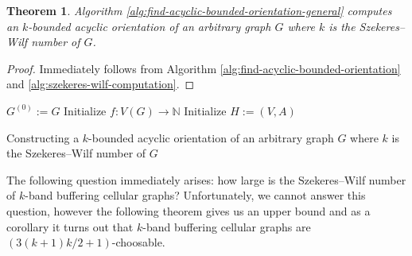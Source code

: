 \documentclass[a4paper, 12pt]{article}
\newtheorem{theo}[lem]{Theorem}
\begin{document}
\begin{theo} Algorithm \ref{alg:find-acyclic-bounded-orientation-general} computes an $k$-bounded acyclic orientation of an arbitrary graph $G$ where $k$ is the Szekeres\---Wilf number of $G$.
\end{theo}

\begin{proof} Immediately follows from Algorithm \ref{alg:find-acyclic-bounded-orientation} and \ref{alg:szekeres-wilf-computation}.
\end{proof}

\begin{algorithm}[h!]\label{alg:find-acyclic-bounded-orientation-general}
 $G^{(0)} := G$\;
 Initialize $f \colon V(G) \to \mathbb{N}$\;
 Initialize $H:=(V,A)$\;
 \caption{Constructing a $k$-bounded acyclic orientation of an arbitrary graph $G$ where $k$ is the Szekeres\---Wilf number of $G$}
\end{algorithm}

The following question immediately arises: how large is the Szekeres\---Wilf number of $k$-band buffering cellular graphs? Unfortunately, we cannot answer this question, however the following theorem gives us an upper bound and as a corollary it turns out that $k$-band buffering cellular graphs are $(3(k+1)k/2+1)$-choosable.
\end{document}
